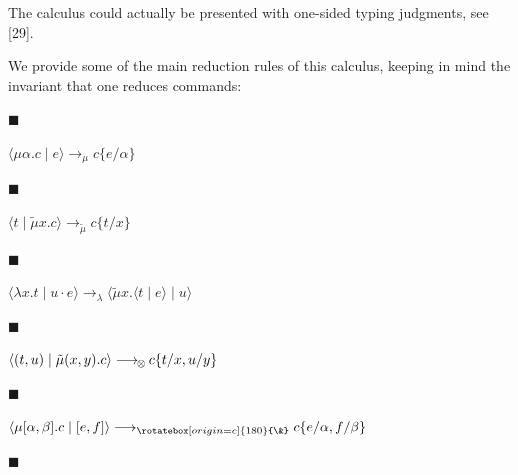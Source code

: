 \documentclass[10pt,a4paper]{article}
\newcommand{\bindnasrepma}{\mathbin{\rotatebox[origin=c]{180}{\&}}}
\begin{document}
 
The calculus could actually be presented with one-sided typing judgments, see [29].\par
 
 
 
 
We provide some of the main reduction rules of this calculus, keeping in mind the invariant that one reduces commands:\par
  
\par\noindent  $\blacksquare$ 
 
$\langle\mu\alpha.c\mid e\rangle\longrightarrow_{\mu}c\{e/\alpha\}$\par
 
 
 
\par\noindent  $\blacksquare$ 
 
$\langle t\mid\tilde{\mu}x.c\rangle\longrightarrow_{\tilde{\mu}}c\{t/x\}$\par
 
 
 
\par\noindent  $\blacksquare$ 
 
$\langle\lambda x.t\mid u\cdot e\rangle\longrightarrow_{\lambda}\langle\tilde{\mu}x.\langle t\mid e\rangle\mid u\rangle$\par
 
 
 
\par\noindent  $\blacksquare$ 
 
$\langle(t,u)\mid\tilde{\mu}(x,y).c\rangle\longrightarrow_{\hskip-1.0pt\otimes\hskip-1.0pt}c\{t/x,u/y\}$\par
 
 
 
\par\noindent  $\blacksquare$ 
 
$\langle\mu[\alpha,\beta].c\mid[e,f]\rangle\longrightarrow_{\bindnasrepma}c\{e/\alpha,f/\beta\}$\par
 
 
 
\par\noindent  $\blacksquare$ 
 
\end{document}
